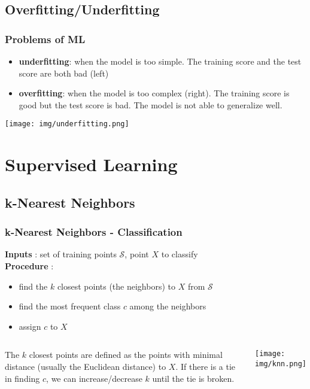 \documentclass{beamer}
\begin{document}
\subsection{Overfitting/Underfitting}
\begin{frame}
  \frametitle{Problems of ML}
  \begin{itemize}
    \item \textbf{underfitting}: when the model is too simple. The training
    score and the test score are both bad (left)
    \item \textbf{overfitting}: when the model is too complex (right). The
    training score is good but the test score is bad. The model is not able to
    generalize well.
  \end{itemize}
  \begin{center}
    \texttt{[image: img/underfitting.png]}
  \end{center}
\end{frame}



\section{Supervised Learning}

\subsection{k-Nearest Neighbors}
\begin{frame}
  \frametitle{k-Nearest Neighbors - Classification}
  \textbf{Inputs} : set of training points $\mathcal{S}$, point $X$ to
  classify\\
  \textbf{Procedure} :
  \begin{itemize}
    \item find the $k$ closest points (the neighbors) to $X$ from $\mathcal{S}$
    \item find the most frequent class $c$ among the neighbors
    \item assign $c$ to $X$
  \end{itemize}

  \begin{columns}
      \parbox{\linewidth}{The $k$ closest points are defined as the points with
      minimal distance (usually the Euclidean distance) to $X$. If there is a
      tie in finding $c$, we can increase/decrease $k$ until the tie is broken.}

      \centering
      \texttt{[image: img/knn.png]}
    \end{columns}
\end{frame}
\end{document}

